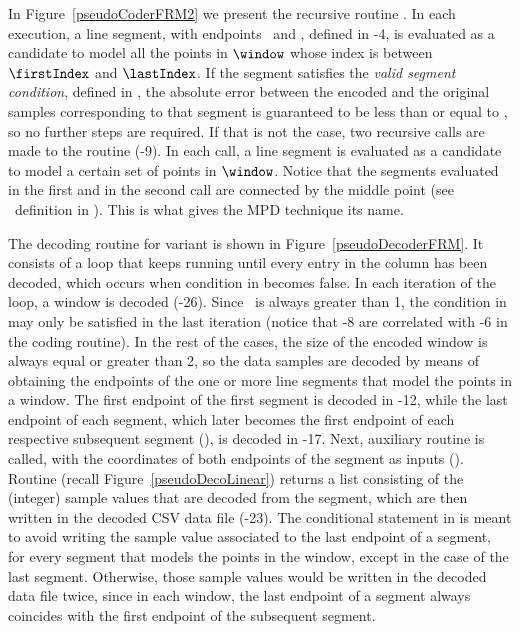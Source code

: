 \vspace{-4pt}
In Figure~\ref{pseudoCoderFRM2} we present the recursive routine \getDisplacedPointsMethod. In each execution, a line segment, with endpoints \pointo\ and \pointf, defined in -4, is evaluated as a candidate to model all the points in $\window$ whose index is between $\firstIndex$ and $\lastIndex$. If the segment satisfies the \textit{valid segment condition}, defined in , the absolute error between the encoded and the original samples corresponding to that segment is guaranteed to be less than or equal to \maxerror, so no further steps are required. If that is not the case, two recursive calls are made to the routine (-9). In each call, a line segment is evaluated as a candidate to model a certain set of points in $\window$. Notice that the segments evaluated in the first and in the second call are connected by the middle point (see \half\ definition in ). This is what gives the MPD technique its name.





\clearpage


The decoding routine for variant \maskalgo is shown in Figure~\ref{pseudoDecoderFRM}. It consists of a loop that keeps running until every entry in the column has been decoded, which occurs when condition in  becomes false. In each iteration of the loop, a window is decoded (-26). Since \win\ is always greater than 1, the condition in  may only be satisfied in the last iteration (notice that -8 are correlated with -6 in the coding routine). In the rest of the cases, the size of the encoded window is always equal or greater than 2, so the data samples are decoded by means of obtaining the endpoints of the one or more line segments that model the points in a window. The first endpoint of the first segment is decoded in -12, while the last endpoint of each segment, which later becomes the first endpoint of each respective subsequent segment (), is decoded in -17. Next, auxiliary routine \decodeSegment is called, with the coordinates of both endpoints of the segment as inputs (). Routine \decodeSegment (recall Figure~\ref{pseudoDecoLinear}) returns a list consisting of the (integer) sample values that are decoded from the segment, which are then written in the decoded CSV data file (-23). The conditional statement in  is meant to avoid writing the sample value associated to the last endpoint of a segment, for every segment that models the points in the window, except in the case of the last segment. Otherwise, those sample values would be written in the decoded data file twice, since in each window, the last endpoint of a segment always coincides with the first endpoint of the subsequent segment.


